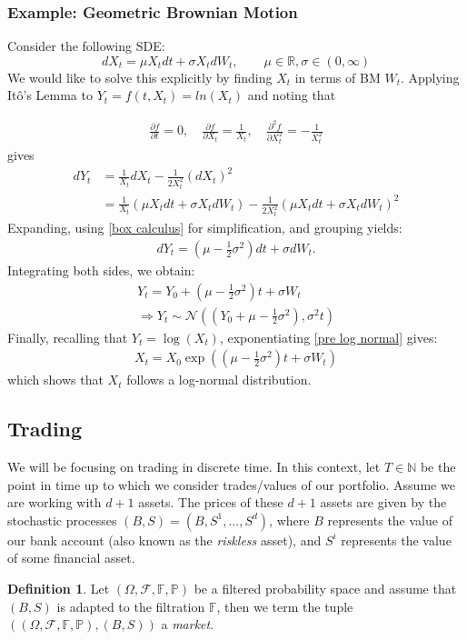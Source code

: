 \documentclass{article}
\theoremstyle{definition}
\newtheorem{definition}{Definition}[section]
\begin{document}
\subsubsection{Example: Geometric Brownian Motion}

Consider the following SDE:
\[
dX_t = \mu X_t dt + \sigma X_t dW_t, \qquad \mu \in \mathbb{R}, \sigma \in (0, \infty)
\]
We would like to solve this explicitly by finding $X_{t}$ in terms of BM $W_{t}$.
Applying Itô's Lemma to $Y_{t} = f(t, X_{t}) = ln(X_{t})$ and noting that 

\begin{align}
\frac{\partial f}{\partial t} = 0, \quad \frac{\partial f}{\partial X_{t}} = \frac{1}{X_{t}}, \quad \frac{\partial^2 f}{\partial X_t^2} = - \frac{1}{X_{t}^{2}}
\end{align}
gives
\begin{align}
    dY_t &= \frac{1}{X_t}dX_t - \frac{1}{2X_t^2} (dX_t)^2\\
         &= \frac{1}{X_t} (\mu X_t dt + \sigma X_t dW_t) - \frac{1}{2X_t^2} (\mu X_t dt + \sigma X_t dW_t)^2    
\end{align}
Expanding, using \ref{box calculus} for simplification, and grouping yields:
\begin{align}
dY_t = \left( \mu - \frac{1}{2} \sigma^2 \right) dt + \sigma dW_t.
\end{align}
Integrating both sides, we obtain:
\begin{align}
\label{pre log normal}
Y_t = Y_0 + \left( \mu - \frac{1}{2} \sigma^2 \right) t + \sigma W_t\\
\Rightarrow Y_t \sim \mathcal{N}\left(\left(Y_0 + \mu - \frac{1}{2}\sigma^2\right), \sigma^2 t\right)
\end{align}
Finally, recalling that $Y_t = \log(X_t)$, exponentiating \ref{pre log normal} gives:
\begin{align}
X_t = X_0 \exp\left( \left( \mu - \frac{1}{2} \sigma^2 \right) t + \sigma W_t \right)    
\end{align}
which shows that $X_t$ follows a log-normal distribution.

\subsection{Trading}
We will be focusing on trading in discrete time. In this context, let $T \in \mathbb{N}$ be the point in time up to which we consider trades/values of our portfolio. Assume we are working with $d+1$ assets. The prices of these $d+1$ assets are given by the stochastic processes $(B,S) = (B, S^1, ..., S^d)$, where $B$ represents the value of our bank account (also known as the \textit{riskless} asset), and $S^i$ represents the value of some financial asset.
\begin{definition}
Let $(\Omega, \mathcal{F}, \mathbb{F}, \mathbb{P})$ be a filtered probability space and assume that $(B,S)$ is adapted to the filtration $\mathbb{F}$, then we term the tuple $((\Omega, \mathcal{F}, \mathbb{F}, \mathbb{P}), (B,S))$ a \textit{market}.
\end{definition}
\end{document}
